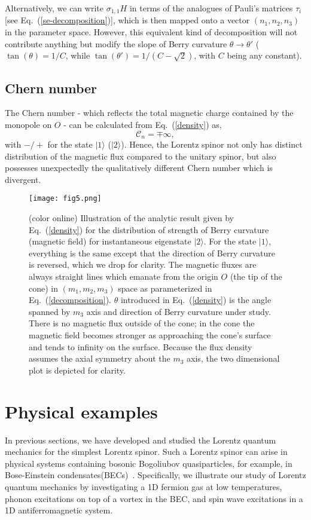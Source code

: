 \documentclass[pra,epsfig,rotate,superscriptaddress,showpacs]{revtex4}
\begin{document}
Alternatively, we can write $\sigma_{1,1} H$ in terms of the analogues of Pauli's matrices $\tau_i$  [see Eq.~(\ref{se-decomposition})], which is then mapped onto a vector $(n_1, n_2, n_3)$ in the parameter space. However, this equivalent kind of decomposition will not contribute anything but modify the slope of Berry curvature $\theta\rightarrow\theta'$ ($\tan(\theta)=1/C$, while $\tan(\theta')=1/(C-\sqrt{2})$, with $C$ being any constant).

\subsection{Chern number}

The Chern number - which reflects the total magnetic charge contained by the monopole on $O$ - can be calculated from Eq.~(\ref{density}) as,
\begin{equation} 
\mathcal{C}_n=\mp \infty,
\end{equation}
with $-/+$ for the state $|1\rangle$ ($|2\rangle$). Hence, the Lorentz spinor not only has distinct distribution of the magnetic flux compared to the unitary spinor, but also possesses unexpectedly the qualitatively different Chern number which is divergent.


\begin{figure}[t]
\texttt{[image: fig5.png]}
\caption{(color online) Illustration of the analytic result given by Eq.~(\ref{density}) for the distribution of strength of Berry curvature (magnetic field) for instantaneous eigenstate $|2\rangle$. For the state $|1\rangle$, everything is the same except that the direction of Berry curvature is reversed, which we drop for clarity. The magnetic fluxes are always straight lines which emanate from the origin $O$ (the tip of the cone) in $(m_1,m_2,m_3)$ space as parameterized in Eq.~(\ref{decomposition}). $\theta$ introduced in Eq.~(\ref{density}) is the angle spanned by $m_3$ axis and direction of Berry curvature under study. There is no magnetic flux outside of the cone; in the cone the magnetic field becomes stronger as approaching the cone's surface and tends to infinity on the surface. Because the flux density assumes the axial symmetry about the $m_3$ axis, the two dimensional plot is depicted for clarity. }
\end{figure}

\section{Physical examples}
\label{examples}
In previous sections, we have developed and studied the Lorentz quantum mechanics for the simplest Lorentz spinor. Such a Lorentz spinor can arise in physical systems containing bosonic Bogoliubov quasiparticles, for example, in Bose-Einstein condensates(BECs)~\cite{njp}.
Specifically,  we illustrate our study of Lorentz quantum mechanics by investigating a 1D fermion gas at low temperatures, phonon excitations on top of a vortex in the BEC,  and spin wave excitations in a 1D antiferromagnetic system.
\end{document}
